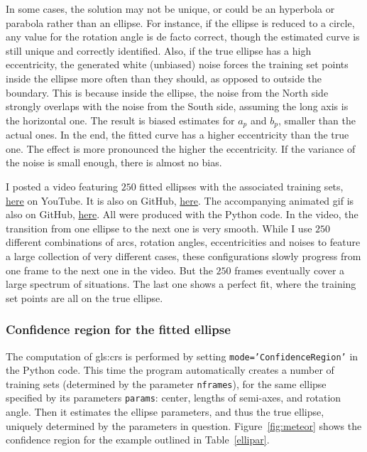 \documentclass[oneside,10pt]{book}
\begin{document}
In some cases, the solution may not be unique, or could be an hyperbola or parabola rather than an ellipse. For instance, if the ellipse is reduced to a circle, any value for the rotation angle is de facto correct, though the estimated curve is still unique and correctly identified. Also, if the true ellipse has a high eccentricity, the generated white (unbiased) noise 
 forces the training set points inside the ellipse more often than they should, as opposed to outside the boundary. This is because inside the ellipse, the noise from the North side strongly overlaps with the noise from the South side, assuming the long axis is the horizontal one. The result is biased estimates for $a_p$ and $b_p$, smaller than the actual ones. In the end, the fitted curve has a higher eccentricity than the true one. The effect is more pronounced the higher the eccentricity. If the variance of the noise is small enough, there is almost no bias.  

I posted a video featuring $250$ fitted ellipses with the associated training sets, \href{https://youtu.be/ReyA9NWyjso}{here}  on YouTube. 
It is also on GitHub, \href{https://github.com/VincentGranville/Machine-Learning/blob/main/Images/ellipseFitting300dpi.mp4}{here}. The accompanying animated gif is also on GitHub, \href{https://github.com/VincentGranville/Machine-Learning/blob/main/Images/ellipse100dpi.gif}{here}. All were produced with the Python code. In the video, the transition from one ellipse to the next one is very smooth. While I use $250$ different combinations of arcs, rotation angles, eccentricities and noises to feature a large collection of very different cases, these configurations slowly progress from one frame to the next one in the video. But the $250$ frames eventually cover a large spectrum of situations. The last one shows a perfect fit, where the training set points are all on the true ellipse.


\subsubsection{Confidence region for the fitted ellipse}

The computation of \glspl{gls:cr} is performed by setting \texttt{mode='ConfidenceRegion'} in the Python code. This time the program automatically creates a number of training sets (determined by the parameter \texttt{nframes}), for the same ellipse  
specified by its parameters \texttt{params}: center, lengths of semi-axes, and rotation angle. 
 Then it estimates the ellipse parameters, and thus the true ellipse, uniquely determined by the parameters in question. Figure~\ref{fig:meteor} shows the confidence region for the example outlined in Table~\ref{ellipar}.
\end{document}
